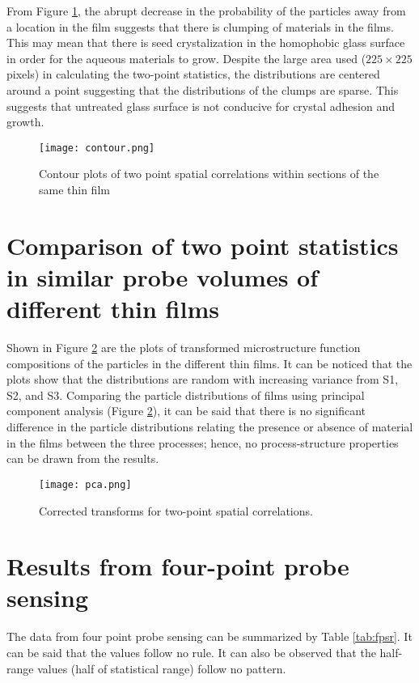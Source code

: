 From Figure \ref{fig:cont}, the abrupt decrease in the probability of the particles away from a location in the film suggests that there is clumping of materials in the films.
This may mean that there is seed crystalization in the homophobic glass surface in order for the aqueous materials to grow.
Despite the large area used ($225\times 225$ pixels) in calculating the two-point statistics, the distributions are centered around a point suggesting that the distributions of the clumps are sparse. 
This suggests that untreated glass surface is not conducive for crystal adhesion and growth.

\begin{figure}
  \centering
  \texttt{[image: contour.png]}
  \caption[Contour plots of spatial correlations]{Contour plots of two point spatial correlations within sections of the same thin film}
  \label{fig:cont}
\end{figure}

\section[Comparison of spatial correlations 2]{Comparison of two point statistics in similar probe volumes of different thin films}

Shown in Figure \ref{fig:pca} are the plots of transformed microstructure function compositions of the particles in the different thin films.
It can be noticed that the plots show that the distributions are random with increasing variance from S1, S2, and S3.
Comparing the particle distributions of films using principal component analysis (Figure \ref{fig:pca}), it can be said that there is no significant difference in the particle distributions relating the presence or absence of material in the films between the three processes; hence, no process-structure properties can be drawn from the results.

\begin{figure}
  \centering
  \texttt{[image: pca.png]}
  \caption[Transformed spatial correlations]{Corrected transforms for two-point spatial correlations.}
  \label{fig:pca}
\end{figure}

\section{Results from four-point probe sensing}
The data from four point probe sensing can be summarized by Table \ref{tab:fpsr}.
It can be said that the values follow no rule.
It can also be observed that the half-range values (half of statistical range) follow no pattern.

